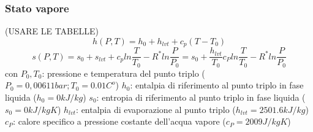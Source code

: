 \subsubsection{Stato vapore}
(USARE LE TABELLE)
\[
    h(P,T) = h_0 + h_{lvt} + c_p (T-T_0)
\]
\[
    s(P,T) = s_0 + s_{lvt} + c_p ln \frac{T}{T_0} - R^* ln \frac{P}{P_0} = s_0 + \frac{h_{lvt}}{T_0} c_P ln \frac{T}{T_0}- R^* ln \frac{P}{P_0}
\]
con \newline
$P_0, T_0$: pressione e temperatura del punto triplo ($P_0 = 0,00611 bar ; T_0 = 0.01 C^o$)\newline
$h_0$: entalpia di riferimento al punto triplo in fase liquida ($h_0 = 0 kJ/kg$)\newline
$s_0$: entropia di riferimento al punto triplo in fase liquida ($s_0 = 0kJ/kgK$)\newline
$h_{lvt}$: entalpia di evaporazione al punto triplo ($h_{lvt} = 2501.6 kJ/kg$)\newline
$c_P$: calore specifico a pressione costante dell'acqua vapore ($c_P = 2009 J/kgK$)